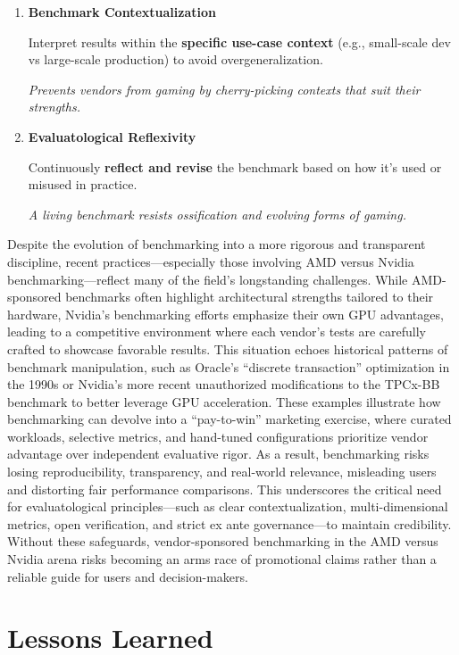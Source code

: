 \begin{enumerate}
    \item \textbf{Benchmark Contextualization}

 Interpret results within the \textbf{specific use-case context} (e.g., small-scale dev vs large-scale production) to avoid overgeneralization.

 \textit{Prevents vendors from gaming by cherry-picking contexts that suit their strengths.}

    \item \textbf{Evaluatological Reflexivity}

 Continuously \textbf{reflect and revise} the benchmark based on how it's used or misused in practice.

 \textit{A living benchmark resists ossification and evolving forms of gaming.}
\end{enumerate}

Despite the evolution of benchmarking into a more rigorous and transparent discipline, recent practices—especially those involving AMD versus Nvidia benchmarking—reflect many of the field’s longstanding challenges. While AMD-sponsored benchmarks often highlight architectural strengths tailored to their hardware, Nvidia’s benchmarking efforts emphasize their own GPU advantages, leading to a competitive environment where each vendor’s tests are carefully crafted to showcase favorable results. This situation echoes historical patterns of benchmark manipulation, such as Oracle’s “discrete transaction” optimization in the 1990s or Nvidia’s more recent unauthorized modifications to the TPCx-BB benchmark to better leverage GPU acceleration. These examples illustrate how benchmarking can devolve into a “pay-to-win” marketing exercise, where curated workloads, selective metrics, and hand-tuned configurations prioritize vendor advantage over independent evaluative rigor. As a result, benchmarking risks losing reproducibility, transparency, and real-world relevance, misleading users and distorting fair performance comparisons. This underscores the critical need for evaluatological principles—such as clear contextualization, multi-dimensional metrics, open verification, and strict ex ante governance—to maintain credibility. Without these safeguards, vendor-sponsored benchmarking in the AMD versus Nvidia arena risks becoming an arms race of promotional claims rather than a reliable guide for users and decision-makers.

\section{Lessons Learned}


